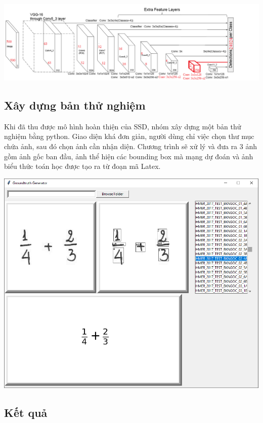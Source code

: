 \documentclass[a4paper,12pt]{article}
\begin{document}
	\begin{center}
		\centering
		\includegraphics[width=0.875\linewidth]{SSD_Struture_5.png}
		\vspace{0.5cm}
	\end{center}
	
	\subsection{Xây dựng bản thử nghiệm}
	
	Khi đã thu được mô hình hoàn thiện của SSD, nhóm xây dựng một bản thử nghiệm bằng python. Giao diện khá đơn giản, người dùng chỉ việc chọn thư mục chứa ảnh, sau đó chọn ảnh cần nhận diện. Chương trình sẽ xử lý và đưa ra 3 ảnh gồm ảnh gốc ban đầu, ảnh thể hiện các bounding box mà mạng dự đoán và ảnh biểu thức toán học được tạo ra từ đoạn mã Latex.
	
	\begin{center}
		
		\centering
		\includegraphics[width=0.8\linewidth]{demoImg.png}
		\vspace{0.5cm}
	\end{center}
	\subsection{Kết quả}
	
\end{document}
